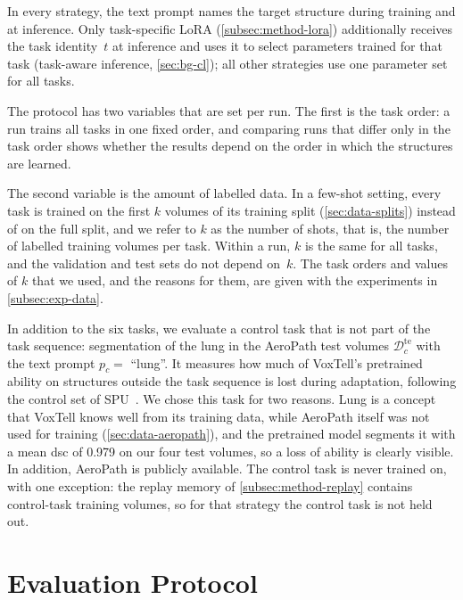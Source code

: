 In every strategy, the text prompt names the target structure during training and at inference.
Only task-specific LoRA (\cref{subsec:method-lora}) additionally receives the task identity~$t$ at inference and uses it to select parameters trained for that task (task-aware inference, \cref{sec:bg-cl}); all other strategies use one parameter set for all tasks.

The protocol has two variables that are set per run.
The first is the task order: a run trains all tasks in one fixed order, and comparing runs that differ only in the task order shows whether the results depend on the order in which the structures are learned.

The second variable is the amount of labelled data.
In a few-shot setting, every task is trained on the first $k$ volumes of its training split (\cref{sec:data-splits}) instead of on the full split, and we refer to $k$ as the number of shots, that is, the number of labelled training volumes per task.
Within a run, $k$ is the same for all tasks, and the validation and test sets do not depend on~$k$.
The task orders and values of $k$ that we used, and the reasons for them, are given with the experiments in \cref{subsec:exp-data}.

In addition to the six tasks, we evaluate a control task that is not part of the task sequence: segmentation of the lung in the AeroPath test volumes $\mathcal{D}_c^{\mathrm{te}}$ with the text prompt $p_c = $ ``lung''.
It measures how much of VoxTell's pretrained ability on structures outside the task sequence is lost during adaptation, following the control set of SPU~\cite{Zhang_2024_CVPR}.
We chose this task for two reasons.
Lung is a concept that VoxTell knows well from its training data, while AeroPath itself was not used for training (\cref{sec:data-aeropath}), and the pretrained model segments it with a mean \gls{dsc} of 0.979 on our four test volumes, so a loss of ability is clearly visible.
In addition, AeroPath is publicly available.
The control task is never trained on, with one exception: the replay memory of \cref{subsec:method-replay} contains control-task training volumes, so for that strategy the control task is not held out.

\section{Evaluation Protocol}
\label{sec:method-protocol}

